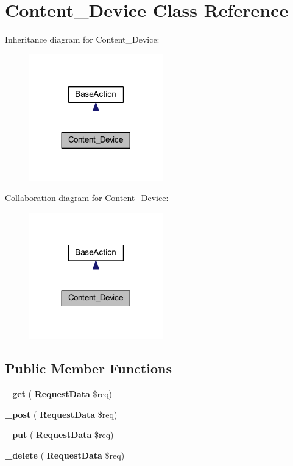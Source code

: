 \section{Content\+\_\+\+Device Class Reference}
\label{class_lora_1_1_content_1_1_content___device}


Inheritance diagram for Content\+\_\+\+Device\+:\nopagebreak
\begin{figure}[H]
\begin{center}
\leavevmode
\includegraphics[width=164pt]{class_lora_1_1_content_1_1_content___device__inherit__graph}
\end{center}
\end{figure}


Collaboration diagram for Content\+\_\+\+Device\+:\nopagebreak
\begin{figure}[H]
\begin{center}
\leavevmode
\includegraphics[width=164pt]{class_lora_1_1_content_1_1_content___device__coll__graph}
\end{center}
\end{figure}
\subsection*{Public Member Functions}
\begin{DoxyCompactItemize}
\item 
\mbox{\label{class_lora_1_1_content_1_1_content___device_a3ad4bf1b146a3180b34d1327ff2abf69}} 
{\bfseries \+\_\+get} (\textbf{ Request\+Data} \$req)
\item 
\mbox{\label{class_lora_1_1_content_1_1_content___device_a50751d47a139282d1c3b08cab1b6562e}} 
{\bfseries \+\_\+post} (\textbf{ Request\+Data} \$req)
\item 
\mbox{\label{class_lora_1_1_content_1_1_content___device_a2affcc8f31c13147c33450193b229194}} 
{\bfseries \+\_\+put} (\textbf{ Request\+Data} \$req)
\item 
\mbox{\label{class_lora_1_1_content_1_1_content___device_ab8ddc6de1e04524212f7d55893f78864}} 
{\bfseries \+\_\+delete} (\textbf{ Request\+Data} \$req)
\end{DoxyCompactItemize}
